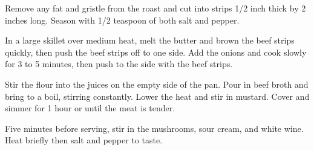 
\info[servings=8,
		time = 100, 
		energy = 304, 
		urlsource = http://allrecipes.com/recipe/25202/beef-stroganoff-iii/]{}

\begin{ingredients}
\end{ingredients}

\begin{preparation}
	\step Remove any fat and gristle from the roast and cut into strips 1/2 inch thick by 2 inches long. Season with 1/2 teaspoon of both salt and pepper.
	
	\step In a large skillet over medium heat, melt the butter and brown the beef strips quickly, then push the beef strips off to one side. Add the onions and cook slowly for 3 to 5 minutes, then push to the side with the beef strips.
	
	\step Stir the flour into the juices on the empty side of the pan. Pour in beef broth and bring to a boil, stirring constantly. Lower the heat and stir in mustard. Cover and simmer for 1 hour or until the meat is tender.
	
	\step Five minutes before serving, stir in the mushrooms, sour cream, and white wine. Heat briefly then salt and pepper to taste.
\end{preparation}


\begin{notes}
\end{notes}


